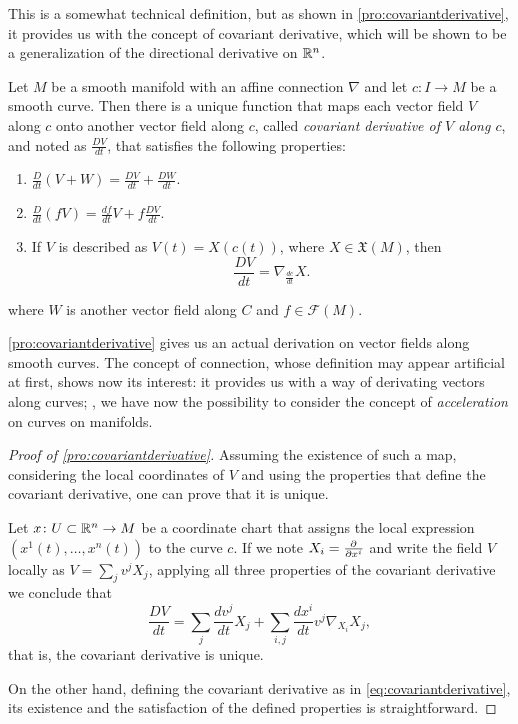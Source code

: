 This is a somewhat technical definition, but as shown in \autoref{pro:covariantderivative}, it provides us with the concept of covariant derivative, which will be shown to be a generalization of the directional derivative on $\mathbb{R}^n$.

\begin{proposition}
	\label{pro:covariantderivative}
	Let $M$ be a smooth manifold with an affine connection $\nabla$ and let $c \colon I \to M$ be a smooth curve. Then there is a unique function that maps each vector field $V$ along $c$ onto another vector field along $c$, called \emph{covariant derivative of $V$ along $c$}, and noted as $\frac{DV}{dt}$, that satisfies the following properties:
	\begin{enumerate}
		\item $\frac{D}{dt}(V+W) = \frac{DV}{dt} + \frac{DW}{dt}$.
		\item $\frac{D}{dt}(fV) = \frac{df}{dt}V + f\frac{DV}{dt}$.
		\item If $V$ is described as $V(t) = X(c(t))$, where $X \in \mathfrak{X}(M)$, then \[\frac{DV}{dt} = \nabla_{\frac{dc}{dt}} X.\]
	\end{enumerate}
	where $W$ is another vector field along $C$ and $f \in \mathcal{F}(M)$.
\end{proposition}

\autoref{pro:covariantderivative} gives us an actual derivation on vector fields along smooth curves. The concept of connection, whose definition may appear artificial at first, shows now its interest: it provides us with a way of derivating vectors along curves; \ie, we have now the possibility to consider the concept of \emph{acceleration} on curves on manifolds.

\begin{proof}[Proof of \autoref{pro:covariantderivative}]
	Assuming the existence of such a map, considering the local coordinates of $V$ and using the properties that define the covariant derivative, one can prove that it is unique.
	
	Let $x \colon U \subset \mathbb{R}^n \to M$ be a coordinate chart that assigns the local expression $(x^1(t), \dots, x^n(t))$ to the curve $c$. If we note $X_i = \frac{\partial^{} }{\partial x^i}$ and write the field $V$ locally as $V = \sum_j v^j X_j$, applying all three properties of the covariant derivative we conclude that
	\begin{equation}
	\label{eq:covariantderivative}
		\frac{DV}{dt} = \sum_j \frac{d v^j}{dt} X_j + \sum_{i,j} \frac{d x^i}{dt} v^j \nabla_{X_i} X_j,
	\end{equation}
	that is, the covariant derivative is unique.
	
	On the other hand, defining the covariant derivative as in \autoref{eq:covariantderivative}, its existence and the satisfaction of the defined properties is straightforward.
\end{proof}

